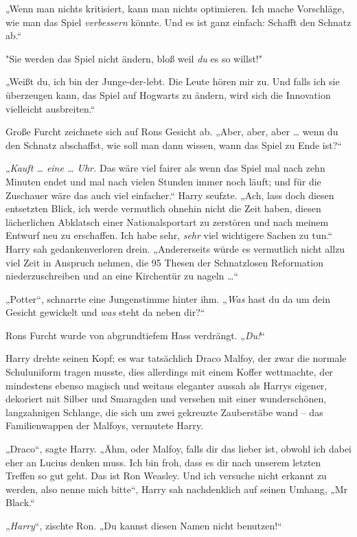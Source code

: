 {„Wenn man nichts kritisiert, kann man nichts optimieren. Ich mache Vorschläge, wie man das Spiel \emph{verbessern} könnte. Und es ist ganz einfach: Schafft den Schnatz ab.“

"Sie werden das Spiel nicht ändern, bloß weil \emph{du} es so willst!"

„Weißt du, ich bin der Junge-der-lebt. Die Leute hören mir zu. Und falls ich sie überzeugen kann, das Spiel auf Hogwarts zu ändern, wird sich die Innovation vielleicht ausbreiten.“

Große Furcht zeichnete sich auf Rons Gesicht ab. „Aber, aber, aber … wenn du den Schnatz abschaffst, wie soll man dann wissen, wann das Spiel zu Ende ist?“

„\emph{Kauft … eine … Uhr.} Das wäre viel fairer als wenn das Spiel mal nach zehn Minuten endet und mal nach vielen Stunden immer noch läuft; und für die Zuschauer wäre das auch viel einfacher.“ Harry seufzte. „Ach, lass doch diesen entsetzten Blick, ich werde vermutlich ohnehin nicht die Zeit haben, diesen lächerlichen Abklatsch einer Nationalsportart zu zerstören und nach meinem Entwurf neu zu erschaffen. Ich habe sehr, \emph{sehr} viel wichtigere Sachen zu tun.“ Harry sah gedankenverloren drein. „Andererseits würde es vermutlich nicht allzu viel Zeit in Anspruch nehmen, die 95 Thesen der Schnatzlosen Reformation niederzuschreiben und an eine Kirchentür zu nageln …“

„Potter“, schnarrte eine Jungenstimme hinter ihm. „\emph{Was} hast du da um dein Gesicht gewickelt und \emph{was} steht da neben dir?“

Rons Furcht wurde von abgrundtiefem Hass verdrängt. „\emph{Du!}“

Harry drehte seinen Kopf; es war tatsächlich Draco Malfoy, der zwar die normale Schuluniform tragen musste, dies allerdings mit einem Koffer wettmachte, der mindestens ebenso magisch und weitaus eleganter aussah als Harrys eigener, dekoriert mit Silber und Smaragden und versehen mit einer wunderschönen, langzahnigen Schlange, die sich um zwei gekreuzte Zauberstäbe wand -- das Familienwappen der Malfoys, vermutete Harry.

„Draco“, sagte Harry. „Ähm, oder Malfoy, falls dir das lieber ist, obwohl ich dabei eher an Lucius denken muss. Ich bin froh, dass es dir nach unserem letzten Treffen so gut geht. Das ist Ron Weasley. Und ich versuche nicht erkannt zu werden, also nenne mich bitte“, Harry sah nachdenklich auf seinen Umhang, „Mr Black.“

„\emph{Harry}“, zischte Ron. „Du kannst diesen Namen nicht benutzen!“

}
